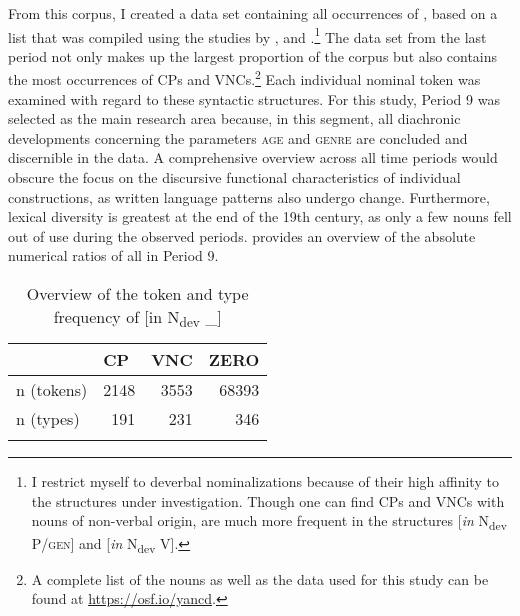 \documentclass[output=paper,colorlinks,citecolor=brown]{langscibook}
\begin{document}
From this corpus, I created a data set containing all occurrences of , based on a list that was compiled using the studies by \citet{Kamber2008}, \citet{Hartmann2016} and \citet{Smirnova2022}.\footnote{I restrict myself to deverbal nominalizations because of their high affinity to the structures under investigation. Though one can find CPs and VNCs with nouns of non-verbal origin,  are much more frequent in the structures [\textit{in} N\textsubscript{dev} P/\textsc{gen}] and [\textit{in} N\textsubscript{dev} V].} The data set from the last period not only makes up the largest proportion of the corpus but also contains the most occurrences of CPs and VNCs.\footnote{A complete list of the nouns as well as the data used for this study can be found at \url{https://osf.io/yancd}.} Each individual nominal token was examined with regard to these syntactic structures. For this study, Period 9 was selected as the main research area because, in this segment, all diachronic developments concerning the parameters \textsc{age} and \textsc{genre} are concluded and discernible in the data. A comprehensive overview across all time periods would obscure the focus on the discursive functional characteristics of individual constructions, as written language patterns also undergo change. Furthermore, lexical diversity is greatest at the end of the 19th century, as only a few nouns fell out of use during the observed periods.  provides an overview of the absolute numerical ratios of all  in Period 9.

\begin{table}
\centering
\begin{tabularx}{0.5\textwidth}{lrrr}
\lsptoprule
 &  \multicolumn{1}{l}{CP} &  \multicolumn{1}{l}{VNC} &  \multicolumn{1}{l}{ZERO}\\
\midrule
{n (tokens)} & 2148 & 3553 & 68393\\
{n (types)} & 191 & 231 & 346\\
\lspbottomrule
\end{tabularx}
\caption{Overview of the token and type frequency of [in N\textsubscript{dev} \_]}
\label{tab:fleissner:2}
\end{table}
\end{document}
